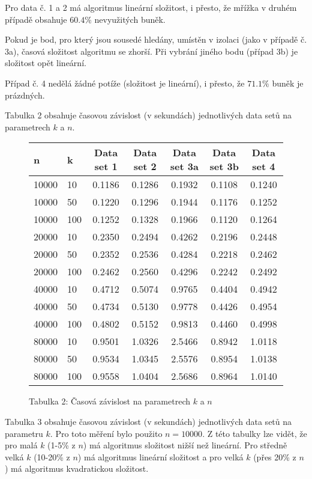 \documentclass[
12pt,
a4paper,
pdftex,
czech,
titlepage
]{report}
\begin{document}
Pro data č. 1 a 2 má algoritmus lineární složitost, i přesto, že mřížka
v druhém případě obsahuje \(60.4\%\) nevyužitých buněk.

Pokud je bod, pro který jsou sousedé hledány, umístěn v izolaci (jako v
případě č. 3a), časová složitost algoritmu se zhorší. Při vybrání jiného
bodu (případ 3b) je složitost opět lineární.

Případ č. 4 nedělá žádné potíže (složitost je lineární), i přesto, že
\(71.1\%\) buněk je prázdných.

Tabulka 2 obsahuje časovou závislost (v sekundách) jednotlivých data
setů na parametrech \(k\) a \(n\).

\begin{figure}[htp]
\centering
\begin{longtable}[]{@{}llccccc@{}}
\toprule
n & k & Data set 1 & Data set 2 & Data set 3a & Data set 3b & Data set
4 \\
\midrule
\endhead
10000 & 10 & 0.1186 & 0.1286 & 0.1932 & 0.1108 & 0.1240 \\
10000 & 50 & 0.1220 & 0.1296 & 0.1944 & 0.1176 & 0.1252 \\
10000 & 100 & 0.1252 & 0.1328 & 0.1966 & 0.1120 & 0.1264 \\
20000 & 10 & 0.2350 & 0.2494 & 0.4262 & 0.2196 & 0.2448 \\
20000 & 50 & 0.2352 & 0.2536 & 0.4284 & 0.2218 & 0.2462 \\
20000 & 100 & 0.2462 & 0.2560 & 0.4296 & 0.2242 & 0.2492 \\
40000 & 10 & 0.4712 & 0.5074 & 0.9765 & 0.4404 & 0.4942 \\
40000 & 50 & 0.4734 & 0.5130 & 0.9778 & 0.4426 & 0.4954 \\
40000 & 100 & 0.4802 & 0.5152 & 0.9813 & 0.4460 & 0.4998 \\
80000 & 10 & 0.9501 & 1.0326 & 2.5466 & 0.8942 & 1.0118 \\
80000 & 50 & 0.9534 & 1.0345 & 2.5576 & 0.8954 & 1.0138 \\
80000 & 100 & 0.9558 & 1.0404 & 2.5686 & 0.8964 & 1.0140 \\
\bottomrule
\end{longtable}
\captionsetup{labelformat=empty}
\caption{Tabulka 2: Časová závislost na parametrech \(k\) a \(n\) \cite{base}}
\end{figure}

Tabulka 3 obsahuje časovou závislost (v sekundách) jednotlivých data
setů na parametru \(k\). Pro toto měření bylo použito \(n = 10000\). Z
této tabulky lze vidět, že pro malá \(k\) (1-5\% z \(n\)) má algoritmus
složitost nižší než lineární. Pro středně velká \(k\) (10-20\% z \(n\))
má algoritmus lineární složitost a pro velká \(k\) (přes 20\% z \(n\))
má algoritmus kvadratickou složitost.
\end{document}
